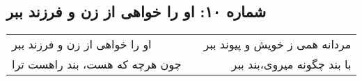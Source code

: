 \begin{center}
\section*{شماره ۱۰: او را خواهی از زن و فرزند ببر}
\label{sec:010}
\begin{longtable}{l p{0.5cm} r}
او را خواهی از زن و فرزند ببر
&&
مردانه همی ز خویش و پیوند ببر
\\
چون هرچه که هست، بند راهست ترا
&&
با بند چگونه میروی،‌بند ببر
\\
\end{longtable}
\end{center}
